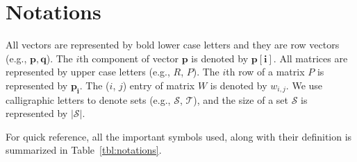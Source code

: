 \chapter{Notations}
\label{ch:notations}


All vectors are represented by bold lower case letters and they are row vectors (e.g., $\bm{p}, \bm{q}$). 
The $i$th component of vector $\bm{p}$ is denoted by $\bm{p[i]}$. All matrices are represented by upper
case letters (e.g., $R$, $P$). The $i$th row of a matrix $P$  is represented by $\bm{p_i}$.
The ($i$, $j$) entry of matrix $W$ is denoted by $w_{i,j}$. 
We use calligraphic letters to denote sets (e.g., $\mathcal{S}$, $\mathcal{T}$), and the size of
a set $\mathcal{S}$ is represented by $|\mathcal{S}|$.



For quick reference, all the important symbols used, along with
their definition is summarized in Table~\ref{tbl:notations}.

